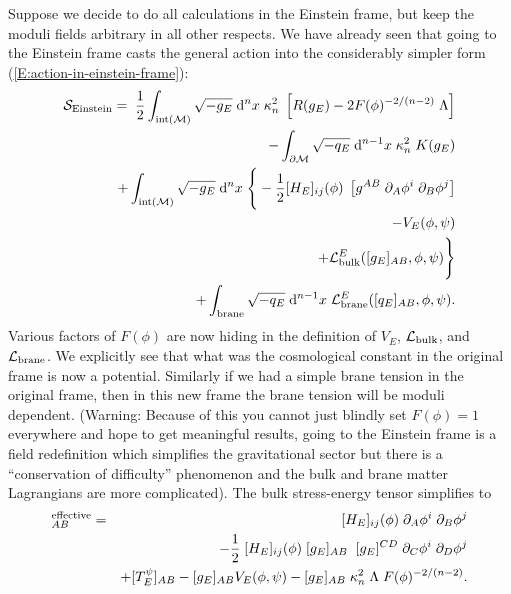 \documentclass[a4paper,10pt]{article}
\begin{document}
{Suppose we decide to do all calculations in the Einstein frame, but
keep the moduli fields arbitrary in all other respects. We have already
seen that going to the Einstein frame casts the general action into the
considerably simpler form (\ref{E:action-in-einstein-frame}):
%
\begin{eqnarray}
\S_\Einstein=&&\hspace{-6mm}
{1 \over 2}\int_{{\rm int}(\M)} \sqrt{-g_E} \;\d^n x \; \kappa_n^{2} \; 
\left[ R(g_E) -2 F(\phi)^{-2/(n-2)} \; \Lambda \right] 
\nonumber\\
&&
-\int_{\partial\M} \sqrt{-q_E} \;\d^{n-1}x \;  \kappa_n^{2} \;K(g_E)
\nonumber\\  
&&\hspace{-6mm}
+\int_{{\rm int}(\M)} \sqrt{-g_E} \;\d^n x \;
\Bigg\{ -{1 \over 2} 
[H_E]_{ij}(\phi) \; 
\left[ g^{AB} \; \partial_{A}\phi^i \; \partial_{B}\phi^j \right] 
\nonumber
\\
&&
\qquad
- V_E(\phi,\psi) 
\nonumber
\\
&&
\qquad
+ \L_\bulk^E([g_E]_{AB},\phi,\psi)
\Bigg\}
\nonumber \\  
&&\hspace{-6mm}
+\int_{\rm brane} \sqrt{-q_E} \;\d^{n-1}x\; 
\L_\brane^E([q_E]_{AB},\phi,\psi).
\label{E:action-in-einstein-frame-simplified}
\end{eqnarray} 
%
Various factors of $F(\phi)$ are now hiding in the definition of
$V_E$, ${\mathcal L}_{\mathrm{bulk}}$, and ${\mathcal L}_{\mathrm{brane}}$.  We explicitly see that what was
the cosmological constant in the original frame is now a potential.
Similarly if we had a simple brane tension in the original frame, then
in this new frame the brane tension will be moduli dependent.
(Warning: Because of this you cannot just blindly set $F(\phi)=1$
everywhere and hope to get meaningful results, going to the Einstein
frame is a field redefinition which simplifies the gravitational sector
but there is a ``conservation of difficulty'' phenomenon and the bulk
and brane matter Lagrangians are more complicated). The bulk
stress-energy tensor simplifies to
%
\begin{eqnarray}
[T_E]_{AB}^\effective &=& 
[H_E]_{ij}(\phi) \; \partial_{A}\phi^i \; \partial_{B}\phi^j 
\nonumber \\
&& - 
{1 \over 2} \;
[H_E]_{ij}(\phi) \; [g_E]_{AB} \;\;
[g_E]^{CD} \;\partial_{C}\phi^i \; \partial_{D}\phi^j 
\nonumber \\
&&
+ [T_E^\psi]_{AB}
- [g_E]_{AB} V_E(\phi,\psi)
- [g_E]_{AB}\; \kappa_n^2 \; \Lambda  \; F(\phi)^{-2/(n-2)} .
\label{E:bulk-einstein-frame}

\end{eqnarray}}
\end{document}
